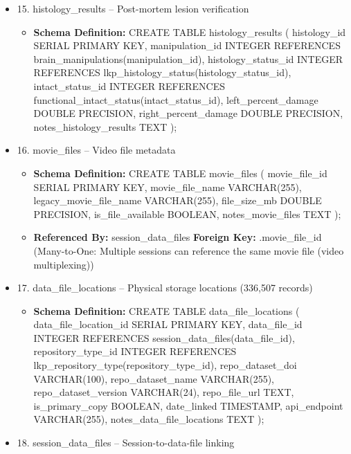 \documentclass[12pt, titlepage]{article}
\begin{document}
\begin{itemize}
\item 15. histology\_results – Post-mortem lesion verification
\begin{itemize}
	\item{\textbf{Schema Definition: }CREATE TABLE histology\_results (
	      histology\_id SERIAL PRIMARY KEY,
	      manipulation\_id INTEGER REFERENCES \\ brain\_manipulations(manipulation\_id),
	      histology\_status\_id INTEGER REFERENCES lkp\_histology\_status(histology\_status\_id),
	      intact\_status\_id INTEGER REFERENCES functional\_intact\_status(intact\_status\_id),
	      left\_percent\_damage DOUBLE PRECISION,
	      right\_percent\_damage DOUBLE PRECISION,
	      notes\_histology\_results TEXT
	      );}
\end{itemize}
\item 16. movie\_files – Video file metadata
\begin{itemize}
	\item{\textbf{Schema Definition: }CREATE TABLE movie\_files (
	      movie\_file\_id SERIAL PRIMARY KEY,
	      movie\_file\_name VARCHAR(255),
	      legacy\_movie\_file\_name VARCHAR(255),
	      file\_size\_mb DOUBLE PRECISION,
	      is\_file\_available BOOLEAN,
	      notes\_movie\_files TEXT
	      );}
	\item{\textbf{Referenced By: }session\_data\_files \textbf{Foreign Key: }.movie\_file\_id (Many-to-One: Multiple sessions can reference the same movie file (video multiplexing))}
\end{itemize}
\item 17. data\_file\_locations – Physical storage locations (336,507 records)
\begin{itemize}
	\item{\textbf{Schema Definition: }CREATE TABLE data\_file\_locations (
	      data\_file\_location\_id SERIAL PRIMARY KEY,
	      data\_file\_id INTEGER REFERENCES session\_data\_files(data\_file\_id),
	      repository\_type\_id INTEGER REFERENCES lkp\_repository\_type(repository\_type\_id),
	      repo\_dataset\_doi VARCHAR(100),
	      repo\_dataset\_name VARCHAR(255),
	      repo\_dataset\_version VARCHAR(24),
	      repo\_file\_url TEXT,
	      is\_primary\_copy BOOLEAN,
	      date\_linked TIMESTAMP,
	      api\_endpoint VARCHAR(255),
	      notes\_data\_file\_locations TEXT
	      );
	      }
\end{itemize}
\item 18. session\_data\_files – Session-to-data-file linking
\begin{itemize}

\end{itemize}
\end{itemize}
\end{document}
